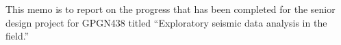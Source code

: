 \documentclass[a4paper,11pt]{texMemo}
\begin{document}
\maketitle

This memo is to report on the progress that has been completed for the senior design project for GPGN438 titled ``Exploratory seismic data analysis in the field.'' \\
\end{document}
